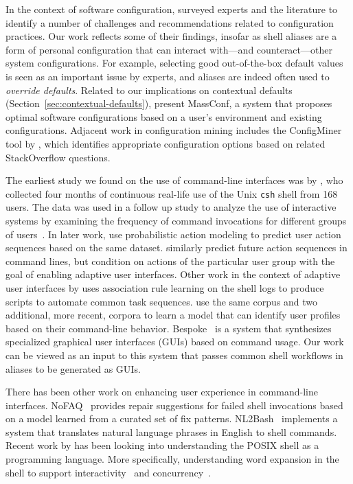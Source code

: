 \documentclass[sigconf,nonacm,screen]{acmart}
\begin{document}
In the context of software configuration, \citet{sayagh2020survey} surveyed experts and the literature to identify a number of challenges and recommendations related to configuration practices.
Our work reflects some of their findings, insofar as shell aliases are a form of personal configuration that can interact with---and counteract---other system configurations.
For example, selecting good out-of-the-box default values is seen as an important issue by experts, and aliases are indeed often used to \emph{override defaults}.
Related to our implications on contextual defaults (Section~\ref{sec:contextual-defaults}), \citet{zhen2011massconf} present MassConf, a system that proposes optimal software configurations based on a user's environment and existing configurations.
Adjacent work in configuration mining includes the ConfigMiner tool by \citet{sayagh2020configminer}, which identifies appropriate configuration options based on related StackOverflow questions.

The earliest study we found on the use of command-line interfaces was by \citet{greenberg:88a}, who collected four months of continuous real-life use of the Unix \verb|csh| shell from 168 users. 
The data was used in a follow up study to analyze the use of interactive systems by examining the frequency of command invocations for different groups of users~\citep{greenberg:88b}.
In later work, \citet{davison:98} use probabilistic action modeling to predict user action sequences based on the same dataset.
\citet{korvemaker:00} similarly predict future action sequences in command lines, but condition on actions of the particular user group with the goal of enabling adaptive user interfaces.
Other work in the context of adaptive user interfaces by \citet{jacobs:01} uses association rule learning on the shell logs to produce scripts to automate common task sequences.
\citet{khosmood:14} use the same corpus and two additional, more recent, corpora to learn a model that can identify user profiles based on their command-line behavior.
Bespoke~\citep{bespoke:19} is a system that synthesizes specialized graphical user interfaces (GUIs) based on command usage.
Our work can be viewed as an input to this system that passes common shell workflows in aliases to be generated as GUIs.

There has been other work on enhancing user experience in command-line interfaces.
NoFAQ~\citep{dantoni:17} provides repair suggestions for failed shell invocations based on a model learned from a curated set of fix patterns.
NL2Bash~\citep{nl2bash} implements a system that translates natural language phrases in English to shell commands.
Recent work by \citet{greenberg:17} has been looking into understanding the POSIX shell as a programming language.
More specifically, understanding word expansion in the shell to support interactivity~\citep{greenberg:18a} and concurrency~\citep{greenberg:18b}.
\end{document}
